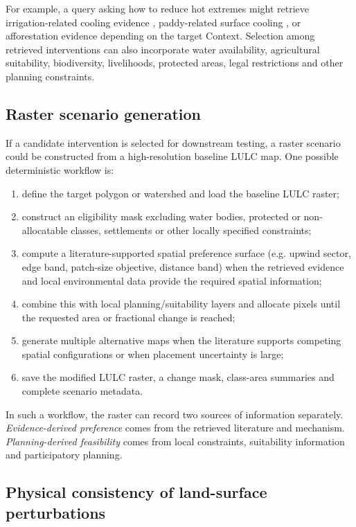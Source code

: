 \documentclass[10pt,twocolumn]{article}
\begin{document}
For example, a query asking how to reduce hot extremes might retrieve irrigation-related cooling evidence \cite{thiery2020}, paddy-related surface cooling \cite{weng2025}, or afforestation evidence depending on the target Context. Selection among retrieved interventions can also incorporate water availability, agricultural suitability, biodiversity, livelihoods, protected areas, legal restrictions and other planning constraints.

\subsection{Raster scenario generation}

If a candidate intervention is selected for downstream testing, a raster scenario could be constructed from a high-resolution baseline LULC map. One possible deterministic workflow is:

\begin{enumerate}
  \item define the target polygon or watershed and load the baseline LULC raster;
  \item construct an eligibility mask excluding water bodies, protected or non-allocatable classes, settlements or other locally specified constraints;
  \item compute a literature-supported spatial preference surface (e.g. upwind sector, edge band, patch-size objective, distance band) when the retrieved evidence and local environmental data provide the required spatial information;
  \item combine this with local planning/suitability layers and allocate pixels until the requested area or fractional change is reached;
  \item generate multiple alternative maps when the literature supports competing spatial configurations or when placement uncertainty is large;
  \item save the modified LULC raster, a change mask, class-area summaries and complete scenario metadata.
\end{enumerate}

In such a workflow, the raster can record two sources of information separately. \emph{Evidence-derived preference} comes from the retrieved literature and mechanism. \emph{Planning-derived feasibility} comes from local constraints, suitability information and participatory planning.

\subsection{Physical consistency of land-surface perturbations}
\end{document}
